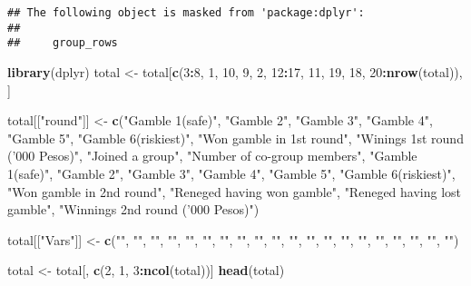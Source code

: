 \documentclass[]{tufte-handout}
\newenvironment{Shaded}{\begin{snugshade}}{\end{snugshade}}
\newcommand{\KeywordTok}[1]{\textcolor[rgb]{0.13,0.29,0.53}{\textbf{#1}}}
\newcommand{\DecValTok}[1]{\textcolor[rgb]{0.00,0.00,0.81}{#1}}
\newcommand{\StringTok}[1]{\textcolor[rgb]{0.31,0.60,0.02}{#1}}
\newcommand{\OperatorTok}[1]{\textcolor[rgb]{0.81,0.36,0.00}{\textbf{#1}}}
\newcommand{\NormalTok}[1]{#1}
\begin{document}
\begin{verbatim}
## The following object is masked from 'package:dplyr':
## 
##     group_rows
\end{verbatim}

\begin{Shaded}
\begin{Highlighting}[]
\KeywordTok{library}\NormalTok{(dplyr)}
\NormalTok{total <-}\StringTok{ }\NormalTok{total[}\KeywordTok{c}\NormalTok{(}\DecValTok{3}\OperatorTok{:}\DecValTok{8}\NormalTok{, }\DecValTok{1}\NormalTok{, }\DecValTok{10}\NormalTok{, }\DecValTok{9}\NormalTok{, }\DecValTok{2}\NormalTok{, }\DecValTok{12}\OperatorTok{:}\DecValTok{17}\NormalTok{, }\DecValTok{11}\NormalTok{, }
    \DecValTok{19}\NormalTok{, }\DecValTok{18}\NormalTok{, }\DecValTok{20}\OperatorTok{:}\KeywordTok{nrow}\NormalTok{(total)), ]}

\NormalTok{total[[}\StringTok{"round"}\NormalTok{]] <-}\StringTok{ }\KeywordTok{c}\NormalTok{(}\StringTok{"Gamble 1(safe)"}\NormalTok{, }\StringTok{"Gamble 2"}\NormalTok{, }
    \StringTok{"Gamble 3"}\NormalTok{, }\StringTok{"Gamble 4"}\NormalTok{, }\StringTok{"Gamble 5"}\NormalTok{, }\StringTok{"Gamble 6(riskiest)"}\NormalTok{, }
    \StringTok{"Won gamble in 1st round"}\NormalTok{, }\StringTok{"Winings 1st round ('000 Pesos)"}\NormalTok{, }
    \StringTok{"Joined a group"}\NormalTok{, }\StringTok{"Number of co-group members"}\NormalTok{, }
    \StringTok{"Gamble 1(safe)"}\NormalTok{, }\StringTok{"Gamble 2"}\NormalTok{, }\StringTok{"Gamble 3"}\NormalTok{, }
    \StringTok{"Gamble 4"}\NormalTok{, }\StringTok{"Gamble 5"}\NormalTok{, }\StringTok{"Gamble 6(riskiest)"}\NormalTok{, }
    \StringTok{"Won gamble in 2nd round"}\NormalTok{, }\StringTok{"Reneged having won gamble"}\NormalTok{, }
    \StringTok{"Reneged having lost gamble"}\NormalTok{, }\StringTok{"Winnings 2nd round ('000 Pesos)"}\NormalTok{)}

\NormalTok{total[[}\StringTok{"Vars"}\NormalTok{]] <-}\StringTok{ }\KeywordTok{c}\NormalTok{(}\StringTok{""}\NormalTok{, }\StringTok{""}\NormalTok{, }\StringTok{""}\NormalTok{, }\StringTok{""}\NormalTok{, }\StringTok{""}\NormalTok{, }\StringTok{""}\NormalTok{, }\StringTok{""}\NormalTok{, }
    \StringTok{""}\NormalTok{, }\StringTok{""}\NormalTok{, }\StringTok{""}\NormalTok{, }\StringTok{""}\NormalTok{, }\StringTok{""}\NormalTok{, }\StringTok{""}\NormalTok{, }\StringTok{""}\NormalTok{, }\StringTok{""}\NormalTok{, }\StringTok{""}\NormalTok{, }\StringTok{""}\NormalTok{, }\StringTok{""}\NormalTok{, }
    \StringTok{""}\NormalTok{, }\StringTok{""}\NormalTok{)}

\NormalTok{total <-}\StringTok{ }\NormalTok{total[, }\KeywordTok{c}\NormalTok{(}\DecValTok{2}\NormalTok{, }\DecValTok{1}\NormalTok{, }\DecValTok{3}\OperatorTok{:}\KeywordTok{ncol}\NormalTok{(total))]}
\KeywordTok{head}\NormalTok{(total)}
\end{Highlighting}
\end{Shaded}
\end{document}

